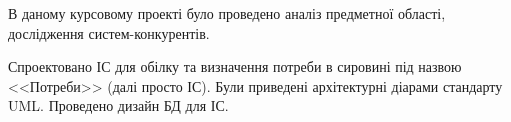 В даному курсовому проекті було проведено аналіз предметної області, дослідження систем-конкурентів.

Спроектовано ІС для обілку та визначення потреби в сировині під назвою <<Потреби>> (далі просто ІС).
Були приведені архітектурні діарами стандарту UML. Проведено дизайн БД для ІС.